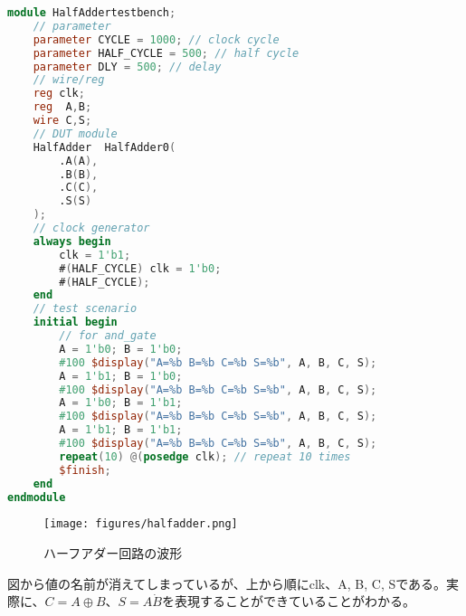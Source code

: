 \documentclass{ltjsarticle}
\begin{document}
\begin{lstlisting}[caption=ハーフアダーテストベンチ,language=verilog]
    module HalfAddertestbench;
    // parameter
    parameter CYCLE = 1000; // clock cycle
    parameter HALF_CYCLE = 500; // half cycle
    parameter DLY = 500; // delay
    // wire/reg
    reg clk;
    reg  A,B;
    wire C,S;
    // DUT module
    HalfAdder  HalfAdder0(
        .A(A),
        .B(B),
        .C(C),
        .S(S)
    );    
    // clock generator
    always begin
        clk = 1'b1;
        #(HALF_CYCLE) clk = 1'b0;
        #(HALF_CYCLE);
    end
    // test scenario
    initial begin
        // for and_gate
        A = 1'b0; B = 1'b0;
        #100 $display("A=%b B=%b C=%b S=%b", A, B, C, S);
        A = 1'b1; B = 1'b0;
        #100 $display("A=%b B=%b C=%b S=%b", A, B, C, S); 
        A = 1'b0; B = 1'b1;
        #100 $display("A=%b B=%b C=%b S=%b", A, B, C, S);  
        A = 1'b1; B = 1'b1;
        #100 $display("A=%b B=%b C=%b S=%b", A, B, C, S);
        repeat(10) @(posedge clk); // repeat 10 times
        $finish;
    end
endmodule
\end{lstlisting}
\begin{figure}[H]
    \begin{center}
        \texttt{[image: figures/halfadder.png]}
        \caption{ハーフアダー回路の波形}
    \end{center}
\end{figure}
図から値の名前が消えてしまっているが、上から順にclk、A, B, C, Sである。実際に、$C=A\oplus B$、$S=A\dot B$を表現することができていることがわかる。
\end{document}
